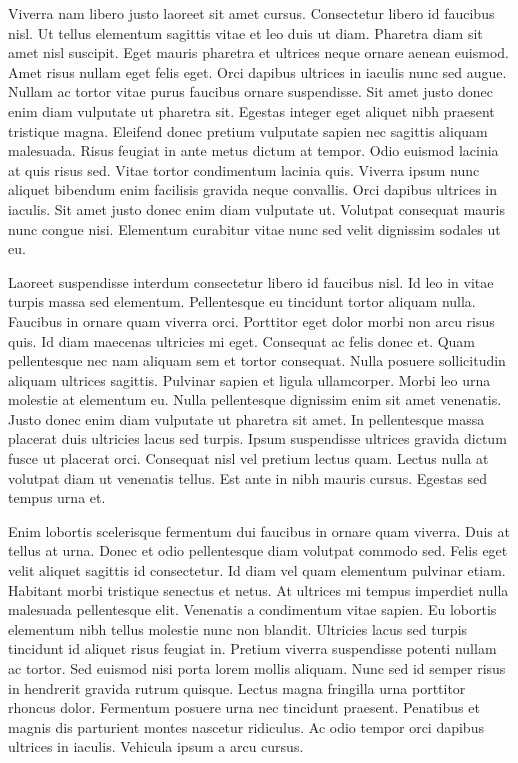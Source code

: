 \documentclass[11pt,a4paper]{article}
\begin{document}
Viverra nam libero justo laoreet sit amet cursus. Consectetur libero id faucibus nisl. Ut tellus elementum sagittis vitae et leo duis ut diam. Pharetra diam sit amet nisl suscipit. Eget mauris pharetra et ultrices neque ornare aenean euismod. Amet risus nullam eget felis eget. Orci dapibus ultrices in iaculis nunc sed augue. Nullam ac tortor vitae purus faucibus ornare suspendisse. Sit amet justo donec enim diam vulputate ut pharetra sit. Egestas integer eget aliquet nibh praesent tristique magna. Eleifend donec pretium vulputate sapien nec sagittis aliquam malesuada. Risus feugiat in ante metus dictum at tempor. Odio euismod lacinia at quis risus sed. Vitae tortor condimentum lacinia quis. Viverra ipsum nunc aliquet bibendum enim facilisis gravida neque convallis. Orci dapibus ultrices in iaculis. Sit amet justo donec enim diam vulputate ut. Volutpat consequat mauris nunc congue nisi. Elementum curabitur vitae nunc sed velit dignissim sodales ut eu.

Laoreet suspendisse interdum consectetur libero id faucibus nisl. Id leo in vitae turpis massa sed elementum. Pellentesque eu tincidunt tortor aliquam nulla. Faucibus in ornare quam viverra orci. Porttitor eget dolor morbi non arcu risus quis. Id diam maecenas ultricies mi eget. Consequat ac felis donec et. Quam pellentesque nec nam aliquam sem et tortor consequat. Nulla posuere sollicitudin aliquam ultrices sagittis. Pulvinar sapien et ligula ullamcorper. Morbi leo urna molestie at elementum eu. Nulla pellentesque dignissim enim sit amet venenatis. Justo donec enim diam vulputate ut pharetra sit amet. In pellentesque massa placerat duis ultricies lacus sed turpis. Ipsum suspendisse ultrices gravida dictum fusce ut placerat orci. Consequat nisl vel pretium lectus quam. Lectus nulla at volutpat diam ut venenatis tellus. Est ante in nibh mauris cursus. Egestas sed tempus urna et.

Enim lobortis scelerisque fermentum dui faucibus in ornare quam viverra. Duis at tellus at urna. Donec et odio pellentesque diam volutpat commodo sed. Felis eget velit aliquet sagittis id consectetur. Id diam vel quam elementum pulvinar etiam. Habitant morbi tristique senectus et netus. At ultrices mi tempus imperdiet nulla malesuada pellentesque elit. Venenatis a condimentum vitae sapien. Eu lobortis elementum nibh tellus molestie nunc non blandit. Ultricies lacus sed turpis tincidunt id aliquet risus feugiat in. Pretium viverra suspendisse potenti nullam ac tortor. Sed euismod nisi porta lorem mollis aliquam. Nunc sed id semper risus in hendrerit gravida rutrum quisque. Lectus magna fringilla urna porttitor rhoncus dolor. Fermentum posuere urna nec tincidunt praesent. Penatibus et magnis dis parturient montes nascetur ridiculus. Ac odio tempor orci dapibus ultrices in iaculis. Vehicula ipsum a arcu cursus.
\end{document}
